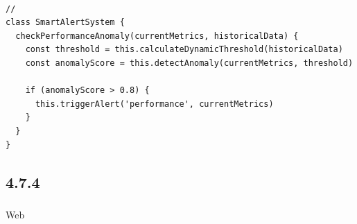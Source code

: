 \important{}\important{}

\important{}

\important{}\important{}\important{}

\important{}

\important{}\important{}

\hypertarget{section-71}{%
\paragraph{}\label{section-71}}

\important{}\important{}

\important{}

\important{}

\begin{lstlisting}[style=javascript]
// 
class SmartAlertSystem {
  checkPerformanceAnomaly(currentMetrics, historicalData) {
    const threshold = this.calculateDynamicThreshold(historicalData)
    const anomalyScore = this.detectAnomaly(currentMetrics, threshold)
    
    if (anomalyScore > 0.8) {
      this.triggerAlert('performance', currentMetrics)
    }
  }
}
\end{lstlisting}

\important{} \important{}

\hypertarget{section-72}{%
\subsection{4.7.4}\label{section-72}}

\hypertarget{section-73}{%
\subsubsection{}\label{section-73}}

\hypertarget{section-74}{%
\paragraph{}\label{section-74}}

\important{}\important{}\important{}Web

\important{}\important{}

\important{}\important{}

\important{}\important{}

\hypertarget{section-75}{%
\paragraph{}\label{section-75}}


